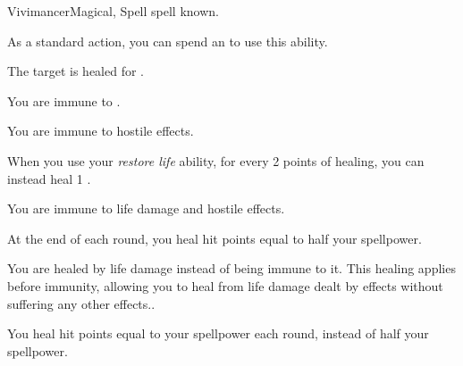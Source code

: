     \begin{feat}{Vivimancer}{Magical, Spell}
        \featpre {} spell known.
        \featben

         As a standard action, you can spend an  to use this ability.
        \begin{ability}
            \begin{spelltargetinginfo}
            \end{spelltargetinginfo}
            \begin{spelleffects}
                \spelleffect The target is healed for \spelldamage{}.
            \end{spelleffects}
        \end{ability}

         You are immune to .

         You are immune to hostile  effects.

         When you use your \textit{restore life} ability, for every 2 points of healing, you can instead heal 1 .

         You are immune to life damage and hostile  effects.

         At the end of each round, you heal hit points equal to half your spellpower.

         You are healed by life damage instead of being immune to it.
        This healing applies before immunity, allowing you to heal from life damage dealt by  effects without suffering any other effects..

         You heal hit points equal to your spellpower each round, instead of half your spellpower.
    \end{feat}

